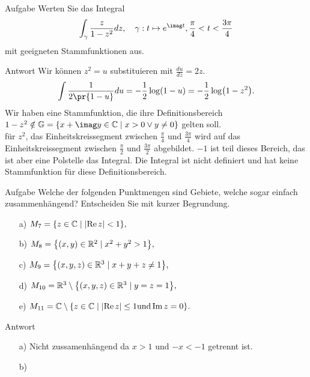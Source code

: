 \documentclass{scrartcl}
\begin{document}
\begin{section}{Aufgabe}%
Werten Sie das Integral
\[\int_{\gamma}\frac{z}{1-z^2}dz,\quad \gamma:t\mapsto e^{\imag t},\frac{\pi}{4}<t<\frac{3 \pi}{4}\]
mit geeigneten Stammfunktionen aus.
    \begin{subsection}{Antwort}
        Wir können $z^2=u$ substituieren mit $\frac{du}{dz}=2z$.
        \[\int \frac{1}{2\pr{1-u}}du=-\frac{1}{2}\log(1-u)=-\frac{1}{2}\log(1-z^2).\]
        Wir haben eine Stammfunktion, die ihre Definitionsbereich $1-z^2\notin \mathbb G=\qty{x+\imag y\in \bC \mid x>0 \lor y\neq 0}$ gelten soll.\\
        für $z^2$, das Einheitskreissegment zwischen $\frac{\pi}{4}$ und $\frac{3\pi}{4}$ wird auf das Einheitskreissegment zwischen $\frac{\pi}{2}$ und $\frac{3 \pi}{2}$ abgebildet.
        $-1$ ist teil dieses Bereich, das ist aber eine Polstelle das Integral.
        Die Integral ist nicht definiert und hat keine Stammfunktion für diese Definitionsbereich.
    \end{subsection}
\end{section}
\begin{section}{Aufgabe}
    Welche der folgenden Punktmengen sind Gebiete, welche sogar einfach zusammenhängend?
Entscheiden Sie mit kurzer Begrundung.
\begin{itemize}
    \item[a)] \(M_7=\qty{z\in\mathbb{C}\mid \abs{\Re z}<1},\)
    \item[b)] \(M_8=\qty{\left(x,y\right) \in\mathbb{R}^2 \mid x^2+y^2>1},\)
    \item[c)] \(M_9=\qty{\left(x,y,z\right) \in\mathbb{R}^3 \mid x+y+z\neq 1},\)
    \item[d)] \(M_{10}=\mathbb{R}^3 \setminus \qty{\left(x,y,z\right) \in\mathbb{R}^3 \mid y=z= 1},\)
    \item[e)] \(M_{11}=\mathbb{C} \setminus \qty{z \in\mathbb{C}\mid \abs{\Re z}\leq 1 \text{und} \Im z=0}.\)
\end{itemize}
      \begin{subsection}{Antwort}
        \begin{itemize}
\item[a)]
Nicht zussamenhängend da $x>1$ und $-x<-1$ getrennt ist.
\item[b)] 
            \end{itemize}
    \end{subsection}  
\end{section}
\end{document}
